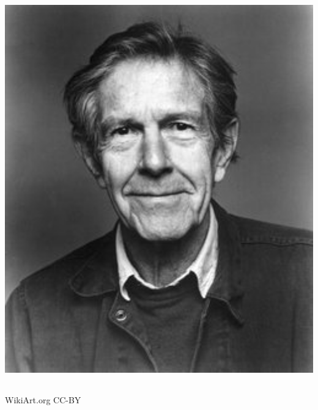 \documentclass[17pt]{extarticle}
\begin{document}
{{\begin{center}
  \includegraphics[height=6.9in]{images/john-cage-portrait.jpg}\\
  {\small WikiArt.org CC-BY }
\end{center}

\newpage


}}
\end{document}
